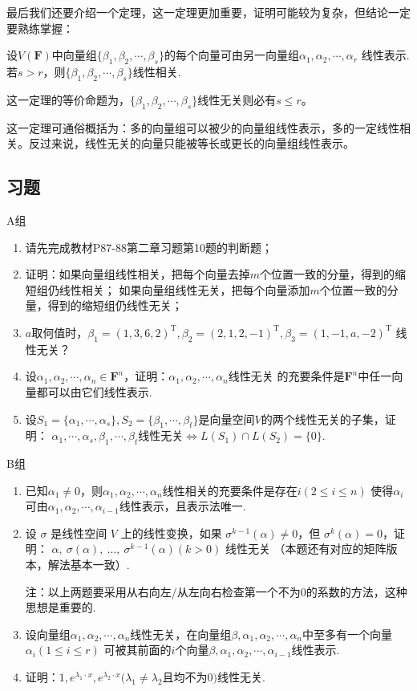 最后我们还要介绍一个定理，这一定理更加重要，证明可能较为复杂，但结论一定要熟练掌握：
\begin{theorem}
	设$V(\mathbf{F})$中向量组$\{\beta_1,\beta_2,\cdots,\beta_s\}$的每个向量可由另一向量组$\alpha_1,\alpha_2,\cdots,\alpha_r$
	线性表示.若$s>r$，则$\{\beta_1,\beta_2,\cdots,\beta_s\}$线性相关.
\end{theorem}
这一定理的等价命题为，$\{\beta_1,\beta_2,\cdots,\beta_s\}$线性无关则必有$s\le r$。

这一定理可通俗概括为：多的向量组可以被少的向量组线性表示，多的一定线性相关。反过来说，线性无关的向量只能被等长或更长的向量组线性表示。
\subsection{习题}
\centerline{\heiti A组}
\begin{enumerate}
	\item 请先完成教材P87-88第二章习题第10题的判断题；
	\item 证明：如果向量组线性相关，把每个向量去掉$m$个位置一致的分量，得到的缩短组仍线性相关；
	如果向量组线性无关，把每个向量添加$m$个位置一致的分量，得到的缩短组仍线性无关；
	\item $a$取何值时，$\beta_1=(1,3,6,2)^\mathrm{T},\beta_2=(2,1,2,-1)^\mathrm{T},\beta_3=(1,-1,a,-2)^\mathrm{T}$
	线性无关？
	\item 设$\alpha_1,\alpha_2,\cdots,\alpha_n\in\mathbf{F}^n$，证明：$\alpha_1,\alpha_2,\cdots,\alpha_n$线性无关
	的充要条件是$\mathbf{F}^n$中任一向量都可以由它们线性表示.
	\item 设$S_1=\{\alpha_1,\cdots,\alpha_s\},S_2=\{\beta_1,\cdots,\beta_t\}$是向量空间$V$的两个线性无关的子集，证明：
	$\alpha_1,\cdots,\alpha_s,\beta_1,\cdots,\beta_t$线性无关$\iff L(S_1)\cap L(S_2)=\{0\}$.
\end{enumerate}
\centerline{\heiti B组}
\begin{enumerate}
	\item 已知$\alpha_1\neq 0$，则$\alpha_1,\alpha_2,\cdots,\alpha_n$线性相关的充要条件是存在$i(2\le i\le n)$
	使得$\alpha_i$可由$\alpha_1,\alpha_2,\cdots,\alpha_{i-1}$线性表示，且表示法唯一.
	\item 设 $\sigma$ 是线性空间 $V$ 上的线性变换，如果 $\sigma^{k-1}(\alpha) \neq 0$，但 $\sigma^{k}(\alpha) = 0$，证明：\newline
	$\alpha,\ \sigma(\alpha),\ \dots,\ \sigma^{k-1}(\alpha)(k>0)$ 线性无关
	（本题还有对应的矩阵版本，解法基本一致）.

	注：以上两题要采用从右向左/从左向右检查第一个不为0的系数的方法，这种思想是重要的.
	\item 设向量组$\alpha_1,\alpha_2,\cdots,\alpha_n$线性无关，在向量组$\beta,\alpha_1,\alpha_2,\cdots,\alpha_n$中至多有一个向量$\alpha_i(1\le i\le r)$
	可被其前面的$i$个向量$\beta,\alpha_1,\alpha_2,\cdots,\alpha_{i-1}$线性表示.
	\item 证明：$1,e^{\lambda_1\cdot x},e^{\lambda_2\cdot  x}(\lambda_1\neq\lambda_2$且均不为0$)$线性无关.
\end{enumerate}
